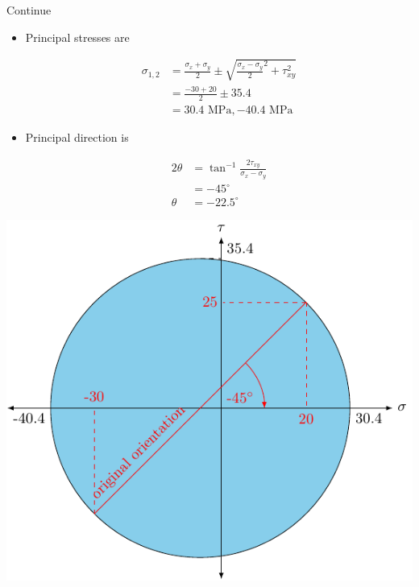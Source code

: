 \documentclass[10pt, svgnames]{beamer}
\begin{document}
\begin{frame}[label={sec:orgd3bece8}]{Continue}
\begin{itemize}
\item Principal stresses are

\begin{align*}
  \sigma_{1,2} &= \frac{\sigma_x + \sigma _y}{2} \pm \sqrt {\frac{\sigma _x - \sigma_y}{2}^2 + \tau _{xy}^2}  \\
               &= \frac{-30 + 20}{2} \pm 35.4 \\
               &= 30.4 \text{ MPa}, - 40.4 \text{ MPa}
\end{align*}

\item Principal direction is

\begin{align*}
  2\theta  &= \tan^{-1}\frac{2\tau_{xy}}{\sigma_x - \sigma_y} \\
           &= -45^{\circ} \\
  \theta &= -22.5^{\circ}
\end{align*}
\end{itemize}
\end{frame}

\begin{frame}[label={sec:orgf6d6e04}]{}
\begin{center}
\includegraphics[width=.9\linewidth]{pictures/example-I-mohrs.pdf}
\end{center}
\end{frame}
\end{document}
